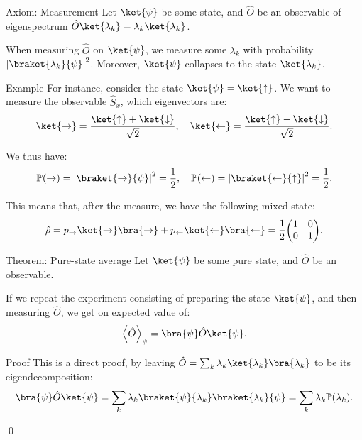 \documentclass[a4paper]{article}
\begin{document}
\begin{parag}{Axiom: Measurement}
    Let $\ket{\psi}$ be some state, and $\hat{O}$ be an observable of eigenspectrum $\hat{O} \ket{\lambda_k} = \lambda_k \ket{\lambda_k}$.

    When measuring $\hat{O}$ on $\ket{\psi}$, we measure some $\lambda_k$ with probability $\left|\braket{\lambda_k}{\psi}\right|^2$. Moreover, $\ket{\psi}$ collapses to the state $\ket{\lambda_k}$.

    \begin{subparag}{Example}
        For instance, consider the state $\ket{\psi} = \ket{\uparrow}$. We want to measure the observable $\hat{S}_x$, which eigenvectors are: 
        \[\ket{\rightarrow} = \frac{\ket{\uparrow} + \ket{\downarrow}}{\sqrt{2}}, \mathspace \ket{\leftarrow} = \frac{\ket{\uparrow} - \ket{\downarrow}}{\sqrt{2}}.\]

        We thus have: 
        \[\prob\left(\rightarrow\right) = \left|\braket{\rightarrow}{\psi}\right|^2 = \frac{1}{2}, \mathspace \prob\left(\leftarrow\right) = \left|\braket{\leftarrow}{\uparrow}\right|^2 = \frac{1}{2}.\]

        This means that, after the measure, we have the following mixed state: 
        \[\hat{\rho} = p_{\rightarrow} \ket{\rightarrow} \bra{\rightarrow} + p_{\leftarrow} \ket{\leftarrow} \bra{\leftarrow} = \frac{1}{2} \begin{pmatrix} 1 & 0 \\ 0 & 1 \end{pmatrix}.\]
    \end{subparag}
\end{parag}

\begin{parag}{Theorem: Pure-state average}
    Let $\ket{\psi}$ be some pure state, and $\hat{O}$ be an observable.

    If we repeat the experiment consisting of preparing the state $\ket{\psi}$, and then measuring $\hat{O}$, we get on expected value of:
    \[\left\langle \hat{O} \right\rangle_{\psi} = \bra{\psi} \hat{O} \ket{\psi}.\]

    \begin{subparag}{Proof}
        This is a direct proof, by leaving $\hat{O} = \sum_{k} \lambda_k \ket{\lambda_k}\bra{\lambda_k}$ to be its eigendecomposition: 
        \[\bra{\psi} \hat{O} \ket{\psi} = \sum_{k} \lambda_k \braket{\psi}{\lambda_k} \braket{\lambda_k}{\psi}  = \sum_{k} \lambda_k \prob\left(\lambda_k\right).\]

        \qed
    \end{subparag}
\end{parag}
\end{document}
